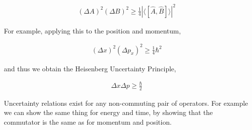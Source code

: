 \documentclass[11pt]{amsart}
\begin{document}
\begin{align*}
  {(\Delta A)}^2 {(\Delta B)}^2 \geq \frac{1}{4} {\left|\langle\left[\hat{A},\hat{B}\right]\rangle\right|}^2
\end{align*}

For example, applying this to the position and momentum,

\begin{align*}
  {(\Delta x)}^2 {(\Delta p_x)}^2 \geq \frac{1}{4} \hbar^2
\end{align*}

and thus we obtain the Heisenberg Uncertainty Principle,

\begin{align*}
  \Delta x \Delta p \geq \frac{\hbar}{2}
\end{align*}

Uncertainty relations exist for any non-commuting pair of operators. For example we can show the same thing for energy and time, by showing that the commutator is the same as for momentum and position.
\end{document}
